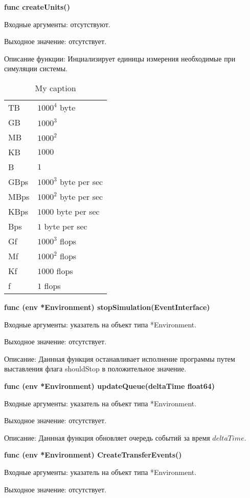 \textbf{func createUnits()}

Входные аргументы: отсутствуют.

Выходное значение: отсутствует.

Описание функции: Инциализирует единицы измерения необходимые при симуляции системы.
\begin{table}[]
\centering
\caption{My caption}
\label{my-label}
\begin{tabularx}{\textwidth}{|X|X|}
TB   & $1000^4$ byte         \\
GB   & $1000^3$              \\
MB   & $1000^2$              \\
KB   & $1000$                \\
B    & $1$                   \\
GBps & $1000^3$ byte per sec \\
MBps & $1000^2$ byte per sec \\
KBps & $1000$ byte per sec   \\
Bps  & $1$ byte per sec      \\
Gf   & $1000^3$ flops        \\
Mf   & $1000^2$ flops        \\
Kf   & $1000$ flops          \\
f    & $1$ flops            
\end{tabularx}
\end{table}

\textbf{func (env *Environment) stopSimulation(EventInterface)}

Входные аргументы: указатель на объект типа *Environment.

Выходное значение: отсутствует.

Описание: Даннная функция останавливает исполнение программы путем выставления флага shouldStop в положительное значение.

\textbf{func (env *Environment) updateQueue(deltaTime float64) }

Входные аргументы: указатель на объект типа *Environment.

Выходное значение: отсутствует.

Описание: Даннная функция обновляет очередь событий за время $deltaTime$. 

\textbf{func (env *Environment) CreateTransferEvents()}

Входные аргументы: указатель на объект типа *Environment.

Выходное значение: отсутствует.

